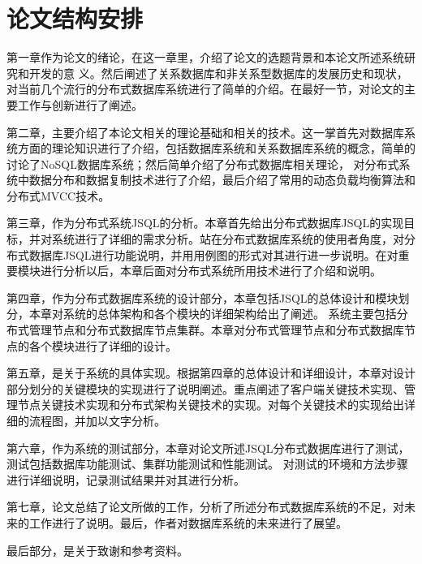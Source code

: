 \section{论文结构安排}
第一章作为论文的绪论，在这一章里，介绍了论文的选题背景和本论文所述系统研究和开发的意
义。然后阐述了关系数据库和非关系型数据库的发展历史和现状，对当前几个流行的分布式数据库系统进行了简单的介绍。在最好一节，对论文的主要工作与创新进行了阐述。

第二章，主要介绍了本论文相关的理论基础和相关的技术。这一掌首先对数据库系统方面的理论知识进行了介绍，包括数据库系统和关系数据库系统的概念，简单的讨论了NoSQL数据库系统；然后简单介绍了分布式数据库相关理论，
对分布式系统中数据分布和数据复制技术进行了介绍，最后介绍了常用的动态负载均衡算法和分布式MVCC技术。

第三章，作为分布式系统JSQL的分析。本章首先给出分布式数据库JSQL的实现目标，并对系统进行了详细的需求分析。站在分布式数据库系统的使用者角度，对分布式数据库JSQL进行功能说明，并用用例图的形式对其进行进一步说明。在对重要模块进行分析以后，本章后面对分布式系统所用技术进行了介绍和说明。

第四章，作为分布式数据库系统的设计部分，本章包括JSQL的总体设计和模块划分，本章对系统的总体架构和各个模块的详细架构给出了阐述。
系统主要包括分布式管理节点和分布式数据库节点集群。本章对分布式管理节点和分布式数据库节点的各个模块进行了详细的设计。

第五章，是关于系统的具体实现。根据第四章的总体设计和详细设计，本章对设计部分划分的关键模块的实现进行了说明阐述。重点阐述了客户端关键技术实现、管理节点关键技术实现和分布式架构关键技术的实现。对每个关键技术的实现给出详细的流程图，并加以文字分析。

第六章，作为系统的测试部分，本章对论文所述JSQL分布式数据库进行了测试，测试包括数据库功能测试、集群功能测试和性能测试。
对测试的环境和方法步骤进行详细说明，记录测试结果并对其进行分析。

第七章，论文总结了论文所做的工作，分析了所述分布式数据库系统的不足，对未来的工作进行了说明。最后，作者对数据库系统的未来进行了展望。

最后部分，是关于致谢和参考资料。